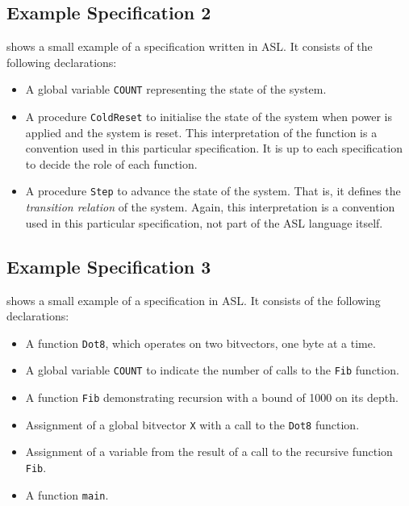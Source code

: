 \subsection{Example Specification 2}
 shows a small example of a specification written in ASL. It consists of the following declarations:
\begin{itemize}
\item A global variable \texttt{COUNT} representing the state of the system.
\item A procedure \texttt{ColdReset} to initialise the state of the system when power is applied and the system is reset.
    This interpretation of the function is a convention used in this particular specification. It is up to each
    specification to decide the role of each function.
\item A procedure \texttt{Step} to advance the state of the system. That is, it defines the \emph{transition relation} of the system.
    Again, this interpretation is a convention used in this particular specification, not part of the ASL language
    itself.
\end{itemize}

\begin{center}

\end{center}

\subsection{Example Specification 3}
 shows a small example of a specification in ASL. It consists of the following declarations:
\begin{itemize}
    \item A function \texttt{Dot8}, which operates on two bitvectors, one byte at a time.
    \item A global variable \texttt{COUNT} to indicate the number of calls to the \texttt{Fib} function.
    \item A function \texttt{Fib} demonstrating recursion with a bound of 1000 on its depth.
    \item Assignment of a global bitvector \texttt{X} with a call to the \texttt{Dot8} function.
    \item Assignment of a variable from the result of a call to the recursive function \texttt{Fib}.
    \item A function \texttt{main}.
\end{itemize}

